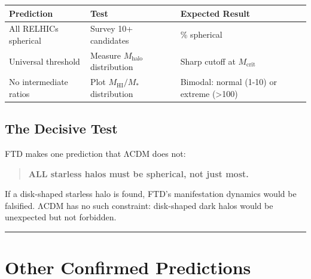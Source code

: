 \documentclass[
  11pt,
  letterpaper,
  twoside,
  openright]{book}
\begin{document}
\begin{longtable}[]{@{}
  >{\raggedright\arraybackslash}p{}
  >{\raggedright\arraybackslash}p{}
  >{\raggedright\arraybackslash}p{}@{}}
\toprule\noalign{}
\begin{minipage}[b]{\linewidth}\raggedright
Prediction
\end{minipage} & \begin{minipage}[b]{\linewidth}\raggedright
Test
\end{minipage} & \begin{minipage}[b]{\linewidth}\raggedright
Expected Result
\end{minipage} \\
\midrule\noalign{}
\endhead
\bottomrule\noalign{}
\endlastfoot
All RELHICs spherical & Survey 10+ candidates & 100\% spherical \\
Universal threshold & Measure \(M_{\text{halo}}\) distribution & Sharp
cutoff at \(M_{\text{crit}}\) \\
No intermediate ratios & Plot \(M_{\text{HI}}/M_*\) distribution &
Bimodal: normal (1-10) or extreme (\textgreater100) \\
\end{longtable}

\subsection{The Decisive Test}\label{the-decisive-test}

FTD makes one prediction that ΛCDM does not:

\begin{quote}
\textbf{ALL starless halos must be spherical, not just most.}
\end{quote}

If a disk-shaped starless halo is found, FTD's manifestation dynamics
would be falsified. ΛCDM has no such constraint: disk-shaped dark halos
would be unexpected but not forbidden.

\begin{center}\rule{0.5\linewidth}{0.5pt}\end{center}

\section{Other Confirmed Predictions}\label{sec-other-confirmed}
\end{document}
